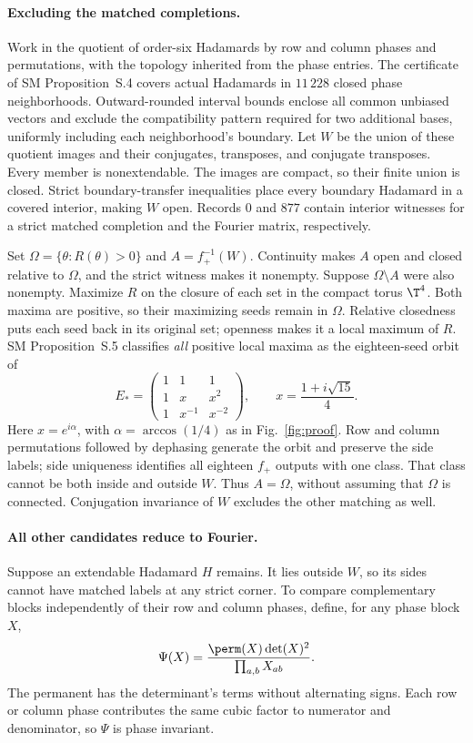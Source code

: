 \paragraph*{Excluding the matched completions.}
Work in the quotient of order-six Hadamards by row and column phases and permutations, with the topology inherited from the phase entries. The certificate of SM Proposition~S.4 covers actual Hadamards in $11\,228$ closed phase neighborhoods. Outward-rounded interval bounds enclose all common unbiased vectors and exclude the compatibility pattern required for two additional bases, uniformly including each neighborhood's boundary. Let $W$ be the union of these quotient images and their conjugates, transposes, and conjugate transposes. Every member is nonextendable. The images are compact, so their finite union is closed. Strict boundary-transfer inequalities place every boundary Hadamard in a covered interior, making $W$ open. Records $0$ and $877$ contain interior witnesses for a strict matched completion and the Fourier matrix, respectively.

Set $\Omega=\{\theta:R(\theta)>0\}$ and $A=f_+^{-1}(W)$. Continuity makes $A$ open and closed relative to $\Omega$, and the strict witness makes it nonempty. Suppose $\Omega\setminus A$ were also nonempty. Maximize $R$ on the closure of each set in the compact torus $\T^4$. Both maxima are positive, so their maximizing seeds remain in $\Omega$. Relative closedness puts each seed back in its original set; openness makes it a local maximum of $R$. SM Proposition~S.5 classifies \emph{all} positive local maxima as the eighteen-seed orbit of
\begin{equation}
 E_* =\begin{pmatrix}1&1&1\\1&x&x^2\\1&x^{-1}&x^{-2}\end{pmatrix},
 \qquad x=\frac{1+i\sqrt{15}}4.
 \label{eq:maximum}
\end{equation}
Here $x=e^{i\alpha}$, with $\alpha=\arccos(1/4)$ as in Fig.~\ref{fig:proof}. Row and column permutations followed by dephasing generate the orbit and preserve the side labels; side uniqueness identifies all eighteen $f_+$ outputs with one class. That class cannot be both inside and outside $W$. Thus $A=\Omega$, without assuming that $\Omega$ is connected. Conjugation invariance of $W$ excludes the other matching as well.

\paragraph*{All other candidates reduce to Fourier.}
Suppose an extendable Hadamard $H$ remains. It lies outside $W$, so its sides cannot have matched labels at any strict corner. To compare complementary blocks independently of their row and column phases, define, for any phase block $X$,
\begin{equation}
 \Psi(X)=\frac{\perm(X)\det(X)^2}{\prod_{a,b}X_{ab}}.
 \label{eq:psi}
\end{equation}
The permanent has the determinant's terms without alternating signs. Each row or column phase contributes the same cubic factor to numerator and denominator, so $\Psi$ is phase invariant.

